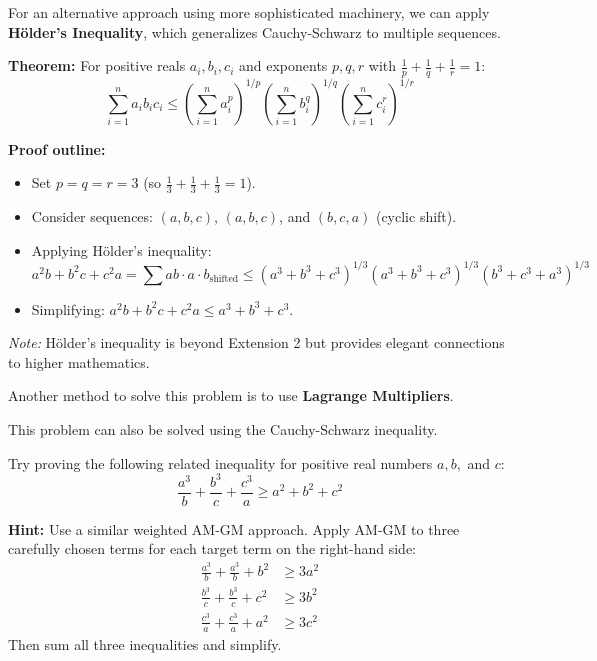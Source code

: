 \begin{remark}
For an alternative approach using more sophisticated machinery, we can apply \textbf{H\"older's Inequality}, which generalizes Cauchy-Schwarz to multiple sequences.

\textbf{Theorem:} For positive reals $a_i, b_i, c_i$ and exponents $p, q, r$ with $\frac{1}{p} + \frac{1}{q} + \frac{1}{r} = 1$:
\[
\sum_{i=1}^n a_i b_i c_i \le \left(\sum_{i=1}^n a_i^p\right)^{1/p} \left(\sum_{i=1}^n b_i^q\right)^{1/q} \left(\sum_{i=1}^n c_i^r\right)^{1/r}
\]


\textbf{Proof outline:}
\begin{itemize}
    \item Set $p = q = r = 3$ (so $\frac{1}{3} + \frac{1}{3} + \frac{1}{3} = 1$).
    \item Consider sequences: $(a, b, c)$, $(a, b, c)$, and $(b, c, a)$ (cyclic shift).
    \item Applying H\"older's inequality:
    \[
    a^2b + b^2c + c^2a = \sum ab \cdot a \cdot b_{\text{shifted}} \le (a^3+b^3+c^3)^{1/3} (a^3+b^3+c^3)^{1/3} (b^3+c^3+a^3)^{1/3}
    \]
    \item Simplifying: $a^2b + b^2c + c^2a \le a^3 + b^3 + c^3$.
\end{itemize}

\textit{Note:} H\"older's inequality is beyond Extension 2 but provides elegant connections to higher mathematics.
\end{remark}

\begin{remark}
Another method to solve this problem is to use \textbf{Lagrange Multipliers}.
\end{remark}

\begin{remark}
This problem can also be solved using the Cauchy-Schwarz inequality.
\end{remark}

\begin{remark}
Try proving the following related inequality for positive real numbers $a, b,$ and $c$:
\[
\frac{a^3}{b} + \frac{b^3}{c} + \frac{c^3}{a} \ge a^2 + b^2 + c^2
\]

\textbf{Hint:} Use a similar weighted AM-GM approach. Apply AM-GM to three carefully chosen terms for each target term on the right-hand side:
\begin{align*}
    \frac{a^3}{b} + \frac{a^3}{b} + b^2 &\ge 3a^2 \\
    \frac{b^3}{c} + \frac{b^3}{c} + c^2 &\ge 3b^2 \\
    \frac{c^3}{a} + \frac{c^3}{a} + a^2 &\ge 3c^2
\end{align*}
Then sum all three inequalities and simplify.
\end{remark}
